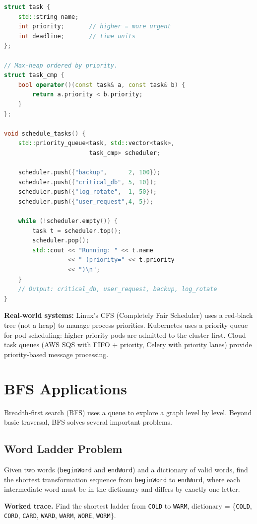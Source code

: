 \begin{lstlisting}[language=C++]
struct task {
    std::string name;
    int priority;       // higher = more urgent
    int deadline;       // time units
};

// Max-heap ordered by priority.
struct task_cmp {
    bool operator()(const task& a, const task& b) {
        return a.priority < b.priority;
    }
};

void schedule_tasks() {
    std::priority_queue<task, std::vector<task>,
                        task_cmp> scheduler;

    scheduler.push({"backup",      2, 100});
    scheduler.push({"critical_db", 5, 10});
    scheduler.push({"log_rotate",  1, 50});
    scheduler.push({"user_request",4, 5});

    while (!scheduler.empty()) {
        task t = scheduler.top();
        scheduler.pop();
        std::cout << "Running: " << t.name
                  << " (priority=" << t.priority
                  << ")\n";
    }
    // Output: critical_db, user_request, backup, log_rotate
}
\end{lstlisting}

\textbf{Real-world systems:} Linux's CFS (Completely Fair Scheduler) uses a red-black tree (not a heap) to manage process priorities. Kubernetes uses a priority queue for pod scheduling: higher-priority pods are admitted to the cluster first. Cloud task queues (AWS SQS with FIFO + priority, Celery with priority lanes) provide priority-based message processing.

\section{BFS Applications}

Breadth-first search (BFS) uses a queue to explore a graph level by level. Beyond basic traversal, BFS solves several important problems.

\subsection{Word Ladder Problem}

Given two words (\texttt{beginWord} and \texttt{endWord}) and a dictionary of valid words, find the shortest transformation sequence from \texttt{beginWord} to \texttt{endWord}, where each intermediate word must be in the dictionary and differs by exactly one letter.

\textbf{Worked trace.} Find the shortest ladder from \texttt{COLD} to \texttt{WARM}, dictionary = \{\texttt{COLD}, \texttt{CORD}, \texttt{CARD}, \texttt{WARD}, \texttt{WARM}, \texttt{WORE}, \texttt{WORM}\}.

